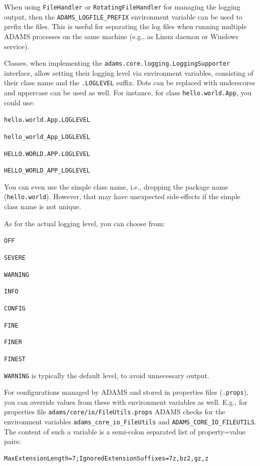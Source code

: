 When using \texttt{FileHandler} or \texttt{RotatingFileHandler} for managing the logging output, then the
\texttt{ADAMS\_LOGFILE\_PREFIX} environment variable can be used to prefix the files. This is useful
for separating the log files when running multiple ADAMS processes on the same machine (e.g., as
Linux daemon or Windows service).

Classes, when implementing the \texttt{adams.core.logging.LoggingSupporter} interface,
allow setting their logging level via environment variables, consisting of their class name and the
\texttt{.LOGLEVEL} suffix. Dots can be replaced with underscores and uppercase can be used as well.
For instance, for class \texttt{hello.world.App}, you could use:
\begin{tight_itemize}
    \item \texttt{hello.world.App.LOGLEVEL}
    \item \texttt{hello\_world\_App\_LOGLEVEL}
    \item \texttt{HELLO.WORLD.APP.LOGLEVEL}
    \item \texttt{HELLO\_WORLD\_APP\_LOGLEVEL}
\end{tight_itemize}
You can even use the simple class name, i.e., dropping the package name (\texttt{hello.world}). However,
that may have unexpected side-effects if the simple class name is not unique.

\noindent As for the actual logging level, you can choose from:
\begin{tight_itemize}
    \item \texttt{OFF}
    \item \texttt{SEVERE}
    \item \texttt{WARNING}
    \item \texttt{INFO}
    \item \texttt{CONFIG}
    \item \texttt{FINE}
    \item \texttt{FINER}
    \item \texttt{FINEST}
\end{tight_itemize}
\texttt{WARNING} is typically the default level, to avoid unnecessary output.

For configurations managed by ADAMS and stored in properties files (\texttt{.props}),
you can override values from these with environment variables as well.
E.g., for properties file \texttt{adams/core/io/FileUtils.props} ADAMS checks for
the environment variables \texttt{adams\_core\_io\_FileUtils} and \texttt{ADAMS\_CORE\_IO\_FILEUTILS}.
The content of such a variable is a semi-colon separated list of property=value pairs:
\begin{verbatim}
MaxExtensionLength=7;IgnoredExtensionSuffixes=7z,bz2,gz,z
\end{verbatim}


